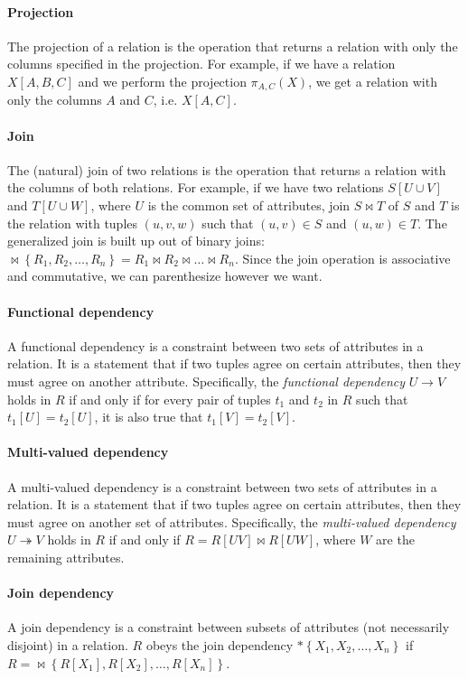\paragraph{Projection}  The projection of a relation is the operation that returns a
relation with only the columns specified in the projection.  For example, if we have a
relation $X[A, B, C]$ and we perform the projection $\pi_{A, C}(X)$, we get a
relation with only the columns $A$ and $C$, i.e. $X[A, C]$.

\paragraph{Join}  The (natural) join of two relations is the operation that returns a
relation with the columns of both relations.  For example, if we have two relations $S[U
\cup V]$ and $T[U \cup W]$, where $U$ is the common set of attributes, join $S \bowtie T$
of $S$ and $T$ is the relation with tuples $(u, v, w)$ such that $(u, v) \in S$ and $(u,
w) \in T$.  The generalized join is built up out of binary joins:  $\bowtie \left\{ R_1,
R_2, \dots, R_n \right\} = R_1 \bowtie R_2 \bowtie \dots \bowtie R_n$. Since the join
operation is associative and commutative, we can parenthesize however we want.

\paragraph{Functional dependency}  A functional dependency is a constraint between two
sets of attributes in a relation.  It is a statement that if two tuples agree on certain
attributes, then they must agree on another attribute.  Specifically, the \emph{functional
dependency} $U \to V$ holds in $R$ if and only if for every pair of tuples $t_1$ and $t_2$
in $R$ such that $t_1[U] = t_2[U]$, it is also true that $t_1[V] = t_2[V]$.

\paragraph{Multi-valued dependency}  A multi-valued dependency is a constraint between
two sets of attributes in a relation.  It is a statement that if two tuples agree on
certain attributes, then they must agree on another set of attributes.  Specifically, the
\emph{multi-valued dependency} $U \twoheadrightarrow V$ holds in $R$ if and only if $R =
R[UV] \bowtie R[UW]$, where $W$ are the remaining attributes.

\paragraph{Join dependency}  A join dependency is a constraint between subsets of
attributes (not necessarily disjoint) in a relation.  $R$ obeys the join dependency $*
\left\{ X_1, X_2, \dots, X_n \right\}$ if $R = \bowtie \left\{ R[X_1], R[X_2], \dots,
R[X_n] \right\}$.

